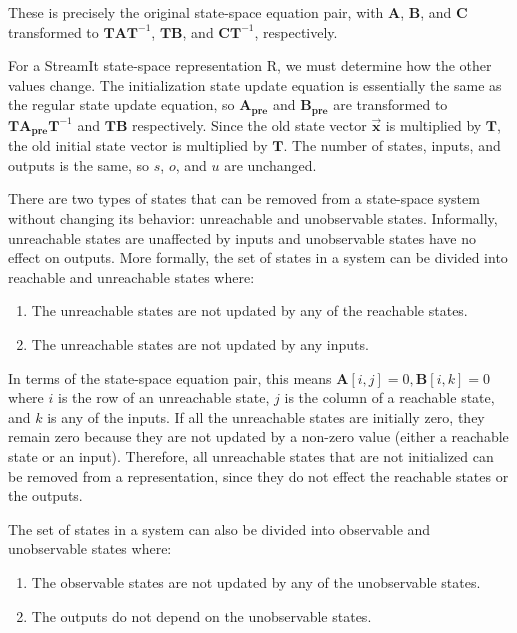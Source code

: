     These is precisely the original state-space equation pair,
with $\mathbf{A}$, $\mathbf{B}$, and $\mathbf{C}$ transformed to
$\mathbf{T} \mathbf{A} \mathbf{T}^{-1}$, $\mathbf{T} \mathbf{B}$,
and $\mathbf{C} \mathbf{T}^{-1}$, respectively.

    For a StreamIt state-space representation $\mathrm{R}$, we must
determine how the other values change. The initialization state
update equation is essentially the same as the regular state
update equation, so $\mathbf{A_{pre}}$ and $\mathbf{B_{pre}}$ are
transformed to $\mathbf{T} \mathbf{A_{pre}} \mathbf{T}^{-1}$ and
$\mathbf{T} \mathbf{B}$ respectively. Since the old state vector
$\vec{\mathbf{x}}$ is multiplied by $\mathbf{T}$, the old initial
state vector is multiplied by $\mathbf{T}$. The number of states,
inputs, and outputs is the same, so $s$, $o$, and $u$ are
unchanged.

\label{sec:state-removal}

    There are two types of states that can be removed from a
state-space system without changing its behavior: unreachable and
unobservable states. Informally, unreachable states are unaffected by
inputs and unobservable states have no effect on outputs. More
formally, the set of states in a system can be divided into reachable
and unreachable states where:
\begin{enumerate}
\vspace{\itemshrink} \item The unreachable states are not updated by any of the
reachable states.

\vspace{\itemshrink} \item The unreachable states are not updated by any inputs.
\vspace{\itemshrink} \end{enumerate}

    In terms of the state-space equation pair, this means $\mathbf{A}[i,j] =
0, \mathbf{B}[i,k] = 0$ where $i$ is the row of an unreachable
state, $j$ is the column of a reachable state, and $k$ is any of
the inputs.
    If all the unreachable states are initially zero, they
remain zero because they are not updated by a non-zero value
(either a reachable state or an input). Therefore, all unreachable
states that are not initialized can be removed from a
representation, since they do not effect the reachable states or
the outputs.

    The set of states in a system can also be divided into
observable and unobservable states where:
\begin{enumerate}
\vspace{\itemshrink} \item The observable states are not updated by any of the
unobservable states.

\vspace{\itemshrink} \item The outputs do not depend on the unobservable states.
\vspace{\itemshrink} \end{enumerate}

